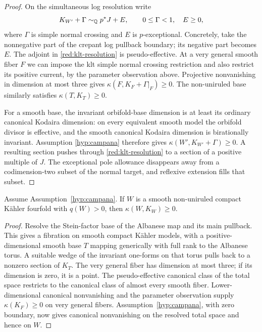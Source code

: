 \begin{proof}
On the simultaneous log resolution write
\begin{equation}\label{red:klt-resolution}
 K_{W'}+\Gamma\sim_{\mathbb{Q}}p^*J+E,
 \qquad 0\leq\Gamma<1,\quad E\geq0,
\end{equation}
where \(\Gamma\) is simple normal crossing and \(E\) is
\(p\)-exceptional. Concretely, take the nonnegative part of the crepant
log pullback boundary; its negative part becomes \(E\).
The adjoint in \eqref{red:klt-resolution} is pseudo-effective. At a
very general smooth fiber \(F\) we can impose the klt simple normal
crossing restriction and also restrict its positive current, by the
parameter observation above. Projective nonvanishing in dimension at
most three gives \(\kappa(F,K_F+\Gamma|_F)\geq0\). The non-uniruled
base similarly satisfies \(\kappa(T,K_T)\geq0\).

For a smooth base, the invariant orbifold-base dimension is at least
its ordinary canonical Kodaira dimension: on every equivalent smooth
model the orbifold divisor is effective, and the smooth canonical
Kodaira dimension is birationally invariant. Assumption
\ref{hyp:campana} therefore gives
\(\kappa(W',K_{W'}+\Gamma)\geq0\). A resulting section pushes through
\eqref{red:klt-resolution} to a section of a positive multiple of
\(J\). The exceptional pole allowance disappears away from a
codimension-two subset of the normal target, and reflexive extension
fills that subset.
\end{proof}

\begin{lemma}\label{red:irregular}
Assume Assumption~\ref{hyp:campana}. If \(W\) is a smooth non-uniruled
compact Kähler fourfold with \(q(W)>0\), then \(\kappa(W,K_W)\geq0\).
\end{lemma}

\begin{proof}
Resolve the Stein-factor base of the Albanese map and its main pullback.
This gives a fibration on smooth compact Kähler models, with a
positive-dimensional smooth base \(T\) mapping generically with full
rank to the Albanese torus. A suitable wedge of the invariant
one-forms on that torus pulls back to a nonzero section of \(K_T\).
The very general fiber has dimension at most three; if its dimension
is zero, it is a point. The pseudo-effective canonical class of the
total space restricts to the canonical class of almost every smooth
fiber. Lower-dimensional canonical nonvanishing and the parameter
observation supply \(\kappa(K_F)\geq0\) on very general fibers.
Assumption~\ref{hyp:campana}, with zero boundary, now gives canonical
nonvanishing on the resolved total space and hence on \(W\).
\end{proof}

